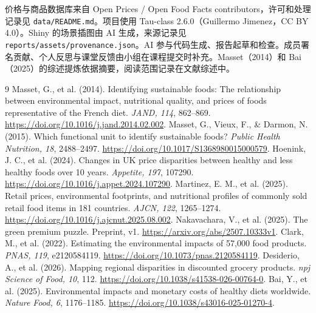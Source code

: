 \documentclass[11pt,a4paper,onecolumn,oneside]{tau-class/tau}
\begin{document}
价格与商品数据库来自 Open Prices / Open Food Facts contributors，许可和处理记录见 \nolinkurl{data/README.md}。项目使用 Tau-class 2.6.0（Guillermo Jimenez，CC BY 4.0）。Shiny 的场景插图由 AI 生成，来源记录见 \nolinkurl{reports/assets/provenance.json}。AI 参与代码生成、报告起草和检查。成员署名贡献、个人反思与课堂反馈由小组在课程提交时补充。Masset（2014）和 Bai（2025）的综述提炼依据摘要，阅读范围记录在文献综述中。
\begin{thebibliography}{9}\small
{} Masset, G., et al. (2014). Identifying sustainable foods: The relationship between environmental impact, nutritional quality, and prices of foods representative of the French diet. \textit{JAND, 114}, 862--869. \url{https://doi.org/10.1016/j.jand.2014.02.002}.
 Masset, G., Vieux, F., \& Darmon, N. (2015). Which functional unit to identify sustainable foods? \textit{Public Health Nutrition, 18}, 2488--2497. \url{https://doi.org/10.1017/S1368980015000579}.
 Hoenink, J. C., et al. (2024). Changes in UK price disparities between healthy and less healthy foods over 10 years. \textit{Appetite, 197}, 107290. \url{https://doi.org/10.1016/j.appet.2024.107290}.
 Martinez, E. M., et al. (2025). Retail prices, environmental footprints, and nutritional profiles of commonly sold retail food items in 181 countries. \textit{AJCN, 122}, 1265--1274. \url{https://doi.org/10.1016/j.ajcnut.2025.08.002}.
 Nakavachara, V., et al. (2025). The green premium puzzle. Preprint, v1. \url{https://arxiv.org/abs/2507.10333v1}.
 Clark, M., et al. (2022). Estimating the environmental impacts of 57,000 food products. \textit{PNAS, 119}, e2120584119. \url{https://doi.org/10.1073/pnas.2120584119}.
 Desiderio, A., et al. (2026). Mapping regional disparities in discounted grocery products. \textit{npj Science of Food, 10}, 112. \url{https://doi.org/10.1038/s41538-026-00764-0}.
 Bai, Y., et al. (2025). Environmental impacts and monetary costs of healthy diets worldwide. \textit{Nature Food, 6}, 1176--1185. \url{https://doi.org/10.1038/s43016-025-01270-4}.
\end{thebibliography}
\end{document}
